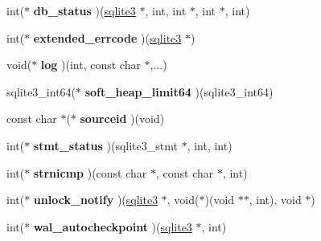 \begin{DoxyCompactItemize}
\item 
int($\ast$ {\bfseries db\+\_\+status} )(\hyperlink{structsqlite3}{sqlite3} $\ast$, int, int $\ast$, int $\ast$, int)\hypertarget{structsqlite3__api__routines_ac3ea73ff30ee0c21446f94a643581280}{}\label{structsqlite3__api__routines_ac3ea73ff30ee0c21446f94a643581280}

\item 
int($\ast$ {\bfseries extended\+\_\+errcode} )(\hyperlink{structsqlite3}{sqlite3} $\ast$)\hypertarget{structsqlite3__api__routines_abc8b842c381e74bd6880f49df71ec395}{}\label{structsqlite3__api__routines_abc8b842c381e74bd6880f49df71ec395}

\item 
void($\ast$ {\bfseries log} )(int, const char $\ast$,...)\hypertarget{structsqlite3__api__routines_ab7e50803433fe04a73e581b0c293f417}{}\label{structsqlite3__api__routines_ab7e50803433fe04a73e581b0c293f417}

\item 
sqlite3\+\_\+int64($\ast$ {\bfseries soft\+\_\+heap\+\_\+limit64} )(sqlite3\+\_\+int64)\hypertarget{structsqlite3__api__routines_a823e82c8ced7470846ff94857b67c1f0}{}\label{structsqlite3__api__routines_a823e82c8ced7470846ff94857b67c1f0}

\item 
const char $\ast$($\ast$ {\bfseries sourceid} )(void)\hypertarget{structsqlite3__api__routines_acb53479251c2ae94a2262b852b48171e}{}\label{structsqlite3__api__routines_acb53479251c2ae94a2262b852b48171e}

\item 
int($\ast$ {\bfseries stmt\+\_\+status} )(sqlite3\+\_\+stmt $\ast$, int, int)\hypertarget{structsqlite3__api__routines_a965fb4dd8b649c8192bcdb436ea8ee4c}{}\label{structsqlite3__api__routines_a965fb4dd8b649c8192bcdb436ea8ee4c}

\item 
int($\ast$ {\bfseries strnicmp} )(const char $\ast$, const char $\ast$, int)\hypertarget{structsqlite3__api__routines_a1ca0d03d2340d21b5f1d2d6b60651e5c}{}\label{structsqlite3__api__routines_a1ca0d03d2340d21b5f1d2d6b60651e5c}

\item 
int($\ast$ {\bfseries unlock\+\_\+notify} )(\hyperlink{structsqlite3}{sqlite3} $\ast$, void($\ast$)(void $\ast$$\ast$, int), void $\ast$)\hypertarget{structsqlite3__api__routines_aad63fcc63d8102991ba13bcb23d3d42c}{}\label{structsqlite3__api__routines_aad63fcc63d8102991ba13bcb23d3d42c}

\item 
int($\ast$ {\bfseries wal\+\_\+autocheckpoint} )(\hyperlink{structsqlite3}{sqlite3} $\ast$, int)\hypertarget{structsqlite3__api__routines_a6f9743cc31d029be8a765529bc693552}{}\label{structsqlite3__api__routines_a6f9743cc31d029be8a765529bc693552}


\end{DoxyCompactItemize}
